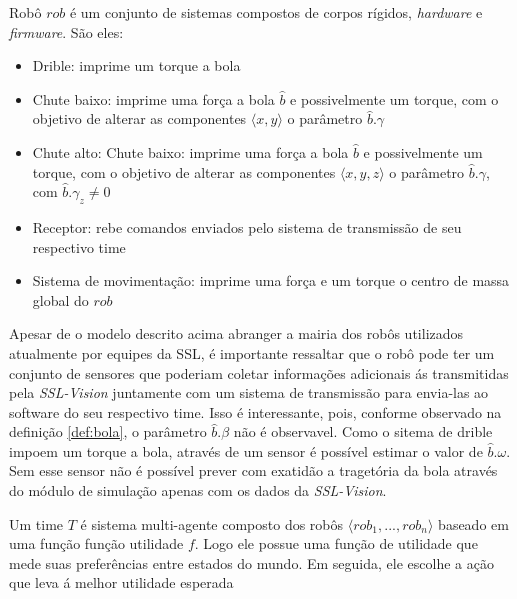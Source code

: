 \begin{defi}[Robô]
  Robô $rob$ é um conjunto de sistemas compostos de corpos rígidos,
  \textit{hardware} e \textit{firmware}. São eles:
  
  \begin{itemize}
    \item Drible: imprime um torque a bola
    \item Chute baixo: imprime uma força a bola $\hat{b}$
          e possivelmente um torque, com o objetivo de
          alterar as componentes $\langle x,y \rangle$
          o parâmetro $\hat{b}.\gamma$ 
    \item Chute alto: Chute baixo: imprime uma força a bola $\hat{b}$
          e possivelmente um torque, com o objetivo de
          alterar as componentes $\langle x,y,z \rangle$
          o parâmetro $\hat{b}.\gamma$, com $\hat{b}.\gamma_z \neq 0$
    \item Receptor: rebe comandos enviados pelo sistema de
          transmissão de seu respectivo time
    \item Sistema de movimentação: imprime uma força e um torque
          o centro de massa global do $rob$
  \end{itemize}  
  
  Apesar de o modelo descrito acima abranger a mairia dos
  robôs utilizados atualmente por equipes da SSL, é importante
  ressaltar que o robô pode ter um conjunto de sensores que
  poderiam coletar informações adicionais ás transmitidas pela
  \textit{SSL-Vision} juntamente com um sistema de transmissão
  para envia-las ao software do seu respectivo time. Isso é
  interessante, pois, conforme observado na definição \ref{def:bola},
  o parâmetro $\hat{b}.\beta$ não é observavel. Como o sitema de
  drible impoem um torque a bola, através de um sensor é possível
  estimar o valor de $\hat{b}.\omega$. Sem esse sensor não é possível
  prever com exatidão a tragetória da bola através do módulo de
  simulação apenas com os dados da \textit{SSL-Vision}.
  
\end{defi}

\begin{defi}[Time]
  Um time $T$ é sistema multi-agente composto dos robôs
  $\langle rob_1, ..., rob_n \rangle$ baseado em uma função
  função utilidade $f$. Logo ele possue uma função de utilidade
  que mede suas preferências entre estados do mundo. Em
  seguida, ele escolhe a ação que leva á melhor utilidade
  esperada
\end{defi}